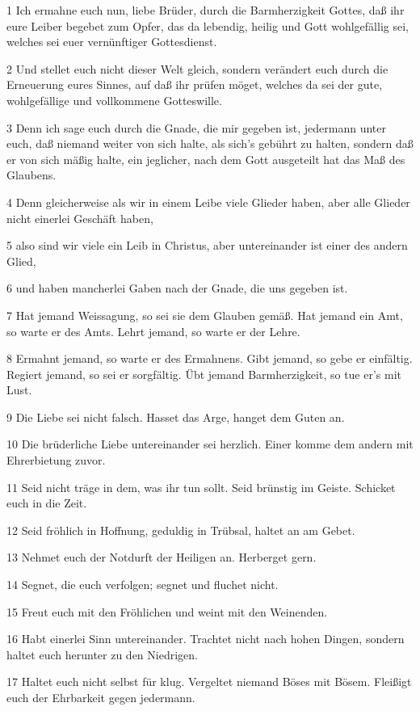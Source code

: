 \par 1 Ich ermahne euch nun, liebe Brüder, durch die Barmherzigkeit Gottes, daß ihr eure Leiber begebet zum Opfer, das da lebendig, heilig und Gott wohlgefällig sei, welches sei euer vernünftiger Gottesdienst.
\par 2 Und stellet euch nicht dieser Welt gleich, sondern verändert euch durch die Erneuerung eures Sinnes, auf daß ihr prüfen möget, welches da sei der gute, wohlgefällige und vollkommene Gotteswille.
\par 3 Denn ich sage euch durch die Gnade, die mir gegeben ist, jedermann unter euch, daß niemand weiter von sich halte, als sich's gebührt zu halten, sondern daß er von sich mäßig halte, ein jeglicher, nach dem Gott ausgeteilt hat das Maß des Glaubens.
\par 4 Denn gleicherweise als wir in einem Leibe viele Glieder haben, aber alle Glieder nicht einerlei Geschäft haben,
\par 5 also sind wir viele ein Leib in Christus, aber untereinander ist einer des andern Glied,
\par 6 und haben mancherlei Gaben nach der Gnade, die uns gegeben ist.
\par 7 Hat jemand Weissagung, so sei sie dem Glauben gemäß. Hat jemand ein Amt, so warte er des Amts. Lehrt jemand, so warte er der Lehre.
\par 8 Ermahnt jemand, so warte er des Ermahnens. Gibt jemand, so gebe er einfältig. Regiert jemand, so sei er sorgfältig. Übt jemand Barmherzigkeit, so tue er's mit Lust.
\par 9 Die Liebe sei nicht falsch. Hasset das Arge, hanget dem Guten an.
\par 10 Die brüderliche Liebe untereinander sei herzlich. Einer komme dem andern mit Ehrerbietung zuvor.
\par 11 Seid nicht träge in dem, was ihr tun sollt. Seid brünstig im Geiste. Schicket euch in die Zeit.
\par 12 Seid fröhlich in Hoffnung, geduldig in Trübsal, haltet an am Gebet.
\par 13 Nehmet euch der Notdurft der Heiligen an. Herberget gern.
\par 14 Segnet, die euch verfolgen; segnet und fluchet nicht.
\par 15 Freut euch mit den Fröhlichen und weint mit den Weinenden.
\par 16 Habt einerlei Sinn untereinander. Trachtet nicht nach hohen Dingen, sondern haltet euch herunter zu den Niedrigen.
\par 17 Haltet euch nicht selbst für klug. Vergeltet niemand Böses mit Bösem. Fleißigt euch der Ehrbarkeit gegen jedermann.
